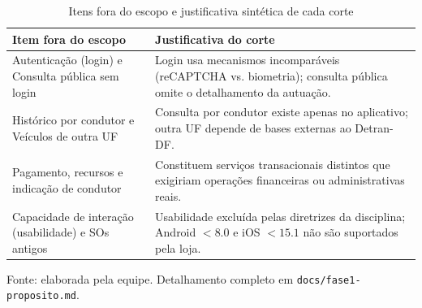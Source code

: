 \begin{table}[htbp]
\centering
\caption{Itens fora do escopo e justificativa sintética de cada corte}
\label{tab:fora-escopo}
\footnotesize
\setlength{\tabcolsep}{3pt}
\begin{tabular}{|P{4.2cm}|P{8.8cm}|}
\hline
\textbf{Item fora do escopo} & \textbf{Justificativa do corte} \\ \hline
Autenticação (login) e Consulta pública sem login & Login usa mecanismos incomparáveis (reCAPTCHA vs. biometria); consulta pública omite o detalhamento da autuação. \\ \hline
Histórico por condutor e Veículos de outra UF & Consulta por condutor existe apenas no aplicativo; outra UF depende de bases externas ao Detran-DF. \\ \hline
Pagamento, recursos e indicação de condutor & Constituem serviços transacionais distintos que exigiriam operações financeiras ou administrativas reais. \\ \hline
Capacidade de interação (usabilidade) e SOs antigos & Usabilidade excluída pelas diretrizes da disciplina; Android $< 8.0$ e iOS $< 15.1$ não são suportados pela loja. \\ \hline
\end{tabular}
\par\smallskip
\raggedright\scriptsize Fonte: elaborada pela equipe. Detalhamento completo em \texttt{docs/fase1-proposito.md}.
\end{table}